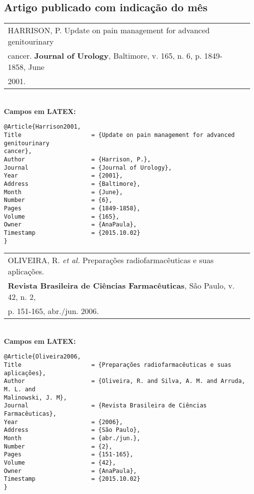 \subsection{Artigo publicado com indicação do mês}

\begin{tabular}{|l|c|} \hline
	HARRISON, P. Update on pain management for advanced genitourinary	\\cancer. \textbf{Journal of Urology}, Baltimore, v. 165, n. 6, p. 1849-1858, June \\2001. 
	\\\hline
\end{tabular} \\

\textbf{Campos em LATEX:} 

\begin{verbatim}
@Article{Harrison2001,
Title                    = {Update on pain management for advanced 
genitourinary 
cancer},
Author                   = {Harrison, P.},
Journal                  = {Journal of Urology},
Year                     = {2001},
Address                  = {Baltimore},
Month                    = {June},
Number                   = {6},
Pages                    = {1849-1858},
Volume                   = {165},
Owner                    = {AnaPaula},
Timestamp                = {2015.10.02}
}
\end{verbatim}

\begin{tabular}{|l|c|} \hline
	OLIVEIRA, R. \textit{et al.} Preparações radiofarmacêuticas e suas aplicações.\\
	\textbf{Revista Brasileira de Ciências Farmacêuticas}, São Paulo, v. 42, n. 2,\\
	p. 151-165, abr./jun. 2006. \\\hline
\end{tabular} \\

\textbf{Campos em LATEX:} 

\begin{verbatim}
@Article{Oliveira2006,
Title                    = {Preparações radiofarmacêuticas e suas 
aplicações},
Author                   = {Oliveira, R. and Silva, A. M. and Arruda, 
M. L. and 
Malinowski, J. M},
Journal                  = {Revista Brasileira de Ciências Farmacêuticas},
Year                     = {2006},
Address                  = {São Paulo},
Month                    = {abr./jun.},
Number                   = {2},
Pages                    = {151-165},
Volume                   = {42},
Owner                    = {AnaPaula},
Timestamp                = {2015.10.02}
}
\end{verbatim}

